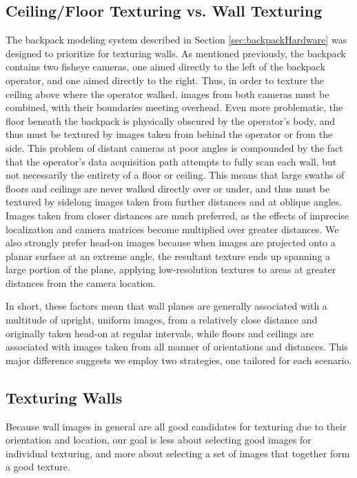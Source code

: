 \documentclass[10pt,twocolumn,letterpaper]{article}
\begin{document}
\subsection{Ceiling/Floor Texturing vs. Wall Texturing}
\label{sec:whydifferent}
The backpack
modeling system described in Section \ref{sec:backpackHardware} was designed to prioritize for
texturing walls. As mentioned previously, the backpack contains two
fisheye cameras, one aimed directly to the left of the backpack
operator, and one aimed directly to the right. Thus, in order to
texture the ceiling above where the operator walked, images from both
cameras must be combined, with their boundaries meeting overhead. Even more problematic, the floor beneath the
backpack is physically obscured by the operator's body, and thus must
be textured by images taken from behind the operator or from the side. This problem of distant cameras at poor angles
is compounded by the fact that the operator's data acquisition path
attempts to fully scan each wall, but not necessarily the entirety of
a floor or ceiling. This means that large swaths of floors and
ceilings are never walked directly over or under, and thus must be
textured by sidelong images taken from further distances and at
oblique angles. Images taken from closer distances are much preferred, as the effects of imprecise localization and camera matrices become multiplied over greater distances. We also strongly prefer head-on images because when images
are projected onto a planar surface at an extreme angle, the resultant
texture ends up spanning a large portion of the plane, applying
low-resolution textures to areas at greater distances from the camera
location.

In short, these factors mean that wall planes are generally associated with a
multitude of upright, uniform images, from a relatively close distance and originally taken head-on at regular intervals, while floors and
ceilings are associated with images taken from all manner of orientations and
distances. This major difference suggests we employ two strategies,
one tailored for each scenario.


\subsection{Texturing Walls}
Because wall images in general are all good candidates for texturing due to their orientation and location, our goal is less about selecting good images for individual texturing, and more about selecting a set of images that together form a good texture.
\end{document}
